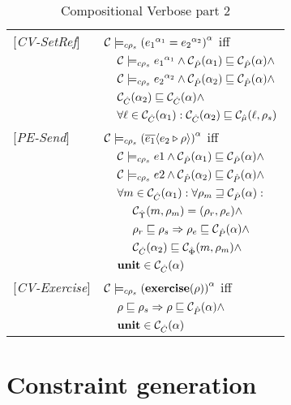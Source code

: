 \begin{table}[tlb]
\begin{tabular} {l l l l}
{[\textit{CV-SetRef}]}&\multicolumn{3}{l}{${\cal C} \models_{c \rho_s} {({e_1}^{\alpha_1} = {e_2}^{\alpha_2})}^{\alpha} $ iff}\\
&&\multicolumn{2}{l}{$ {\cal C} \models_{c \rho_s} {e_1}^{\alpha_1} \wedge {\cal C}_{\hat{P}}(\alpha_1) \sqsubseteq {\cal C}_{\hat{P}}(\alpha) \wedge $}\\
&&\multicolumn{2}{l}{$ {\cal C} \models_{c \rho_s} {e_2}^{\alpha_2} \wedge {\cal C}_{\hat{P}}(\alpha_2) \sqsubseteq {\cal C}_{\hat{P}}(\alpha) \wedge $}\\
&&\multicolumn{2}{l}{${\cal C}_{\hat{C}}(\alpha_2) \sqsubseteq {\cal C}_{\hat{C}}(\alpha) \wedge$} \\
&&\multicolumn{2}{l}{$ \forall \ell \in {\cal C}_{\hat{C}}(\alpha_1) : {\cal C}_{\hat{C}}(\alpha_2) \sqsubseteq {\cal C}_{\hat{\mu}}(\ell, \rho_s)$} \\
{[\textit{PE-Send}]}&\multicolumn{3}{l}{${\cal C} \models_{c \rho_s} {(\overline{e_1} \langle e_2 \triangleright \rho \rangle)}^{\alpha} $ iff}\\
&&\multicolumn{2}{l}{$ {\cal C} \models_{c \rho_s} e1 \wedge {\cal C}_{\hat{P}}(\alpha_1) \sqsubseteq {\cal C}_{\hat{P}}(\alpha) \wedge$}\\
&&\multicolumn{2}{l}{$ {\cal C} \models_{c \rho_s} e2 \wedge {\cal C}_{\hat{P}}(\alpha_2) \sqsubseteq {\cal C}_{\hat{P}}(\alpha) \wedge$}\\
&&\multicolumn{2}{l}{$ \forall m \in {\cal C}_{\hat{C}}(\alpha_1) : \forall \rho_m \sqsupseteq {\cal C}_{\hat{P}}(\alpha):$}\\
&&&${\cal C}_{\hat{\Upsilon}}(m, \rho_m) = (\rho_r, \rho_e)\wedge $\\
&&&$\rho_r \sqsubseteq \rho_s \Rightarrow \rho_e \sqsubseteq {\cal C}_{\hat{P}}(\alpha) \wedge$\\
&&&${\cal C}_{\hat{C}}(\alpha_2) \sqsubseteq {\cal C}_{\hat{\Phi}}(m, \rho_m) \wedge $\\
&&\multicolumn{2}{l}{$\mathbf{unit} \in {\cal C}_{\hat{C}}(\alpha) $}\\
{[\textit{CV-Exercise}]}&\multicolumn{3}{l}{${\cal C} \models_{c \rho_s} {(\mathbf{exercise}(\rho))}^{\alpha} $ iff}\\
&&\multicolumn{2}{l}{$ \rho \sqsubseteq \rho_s \Rightarrow \rho \sqsubseteq {\cal C}_{\hat{P}}(\alpha) \wedge $}\\
&&\multicolumn{2}{l}{$ \mathbf{unit} \in {\cal C}_{\hat{C}}(\alpha)$}\\
\end{tabular}
\caption{Compositional Verbose part 2}
\label{tab:CompVerb2}
\end{table}



\section{Constraint generation}
\label{sec:ConstraintGen}
\newcommand{\genl}[1]{\mathcal{C}_{*\rho_s}\llbracket (#1)^\all \rrbracket}
\newcommand{\gen}[1]{\mathcal{C}_{*\rho_s}\llbracket (#1) \rrbracket}
\newcommand{\Cel}{\mathsf{C}}
\newcommand{\Rel}{\mathsf{\Gamma}}
\newcommand{\Pel}{\mathsf{P}}
\newcommand{\Mel}{\mathsf{M}}
\newcommand{\El}{\mathsf{E}}
\newcommand{\braces}[1]{\{ #1 \} }
\newcommand{\parens}[1]{\( #1 \) }

